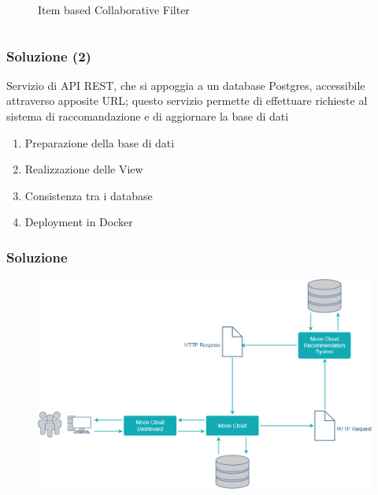 \begin{frame}
\begin{columns}
\begin{column}{0.5\textwidth}
\begin{figure}
                \caption{Item based Collaborative Filter}
            \end{figure}
        \end{column}
    \end{columns}
\end{frame}

\begin{frame}
    \frametitle{Soluzione (2)}
    Servizio di API REST, che si appoggia a un database Postgres, accessibile 
    attraverso apposite URL; questo servizio permette di effettuare richieste al sistema di raccomandazione e di aggiornare la base di dati
    \begin{enumerate}
        \item Preparazione della base di dati
        \item Realizzazione delle View
        \item Consistenza tra i database
        \item Deployment in Docker
    \end{enumerate}
\end{frame}

\begin{frame}
    \frametitle{Soluzione}
    \begin{figure}
        \centering
        \includegraphics[scale=0.42]{images/UML_MoonCloud_HowToDo}
    \end{figure}
\end{frame}








